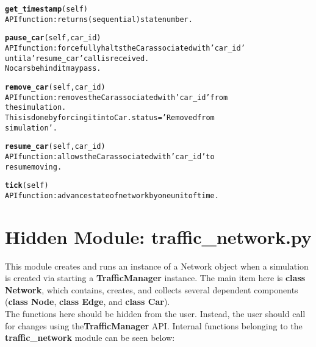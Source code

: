 \begin{alltt}
\textbf{get_timestamp}(self)
API function:  returns (sequential) state number.

\textbf{pause_car}(self, car_id)
API function:  forcefully halts the Car associated with 'car_id' 
until a 'resume_car' call is received.
No cars behind it may pass.

\textbf{remove_car}(self, car_id)
API function:  removes the Car associated with 'car_id' from
the simulation.
This is done by forcing it into Car.status = 'Removed from 
simulation'.

\textbf{resume_car}(self, car_id)
API function:  allows the Car associated with 'car_id' to 
resume moving.

\textbf{tick}(self)
API function:  advance state of network by one unit of time.


\end{alltt}

\section{Hidden Module: traffic\_network.py}

This module creates and runs an instance of a Network object when a simulation is created via starting a \textbf{TrafficManager} instance.  The main item here is \textbf{class Network}, which  contains, creates, and collects several dependent components (\textbf{class Node}, \textbf{class Edge}, and \textbf{class Car}).  \\

\noindent The functions here should be hidden from the user.  Instead, the user should call for changes using the\textbf{TrafficManager} API.  Internal functions belonging to the \textbf{traffic\_network} module can be seen below:


